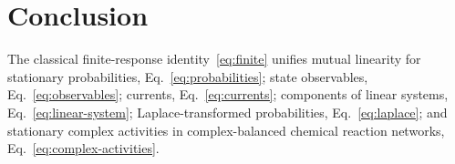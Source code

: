 \documentclass[
  reprint,
  superscriptaddress,
  amsmath,
  amssymb,
  aps,
  pre,
  longbibliography
]{revtex4-2}
\begin{document}
\section{Conclusion}
\label{sec:conclusion}

The classical finite-response identity~\eqref{eq:finite} unifies
mutual linearity for stationary probabilities, Eq.~\eqref{eq:probabilities};
state observables, Eq.~\eqref{eq:observables}; currents, Eq.~\eqref{eq:currents};
components of linear systems, Eq.~\eqref{eq:linear-system};
Laplace-transformed probabilities, Eq.~\eqref{eq:laplace}; and stationary
complex activities in complex-balanced chemical reaction networks,
Eq.~\eqref{eq:complex-activities}.


\end{document}
